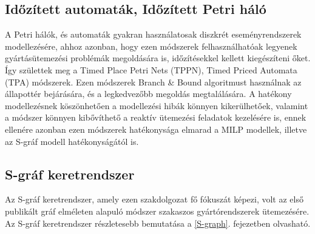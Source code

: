 \subsection{Időzített automaták, Időzített Petri háló}
A Petri hálók, és automaták gyakran használatosak diszkrét eseményrendszerek modellezésére, ahhoz azonban, hogy ezen módszerek felhasználhatóak legyenek gyártásütemezési problémák megoldására is, időzítésekkel kellett kiegészíteni őket.
Így születtek meg a Timed Place Petri Nets (TPPN), Timed Priced Automata (TPA) módszerek.
Ezen módszerek Branch \& Bound algoritmust használnak az állapottér bejárására, és a legkedvezőbb megoldás megtalálására.
A hatékony modellezésnek köszönhetően a modellezési hibák könnyen kikerülhetőek, valamint a módszer könnyen kibővíthető a reaktív ütemezési feladatok kezelésére is, ennek ellenére azonban ezen módszerek hatékonysága elmarad a MILP modellek, illetve az S-gráf modell hatékonyságától is.  
\subsection{S-gráf keretrendszer}
Az S-gráf keretrendszer, amely ezen szakdolgozat fő fókuszát képezi, volt az első publikált gráf elméleten alapuló módszer szakaszos gyártórendszerek ütemezésére.
Az S-gráf keretrendszer részletesebb bemutatása a \ref{S-graph}. fejezetben olvasható. 
